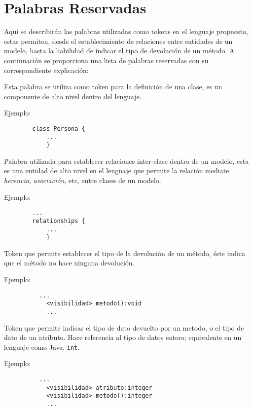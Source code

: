 \section{Palabras Reservadas}
\label{sec:palabrasreservadas}

Aquí se describirán las palabras utilizadas como tokens en el lenguaje
propuesto, estas permiten, desde el establecimiento de relaciones
entre entidades de un modelo, hasta la habilidad de indicar el tipo de devolución
de un método. A continuación se proporciona una lista de palabras reservadas
con su correspondiente explicación:

\begin{description}[align=right,labelwidth=2.5cm]

\item [class] Esta palabra se utiliza como token para la definición de una clase,
	es un componente de alto nivel dentro del lenguaje.

	Ejemplo:
		\begin{lstlisting}
		class Persona {
			...
			}
		\end{lstlisting}

\item [relationships] Palabra utilizada para establecer relaciones inter-clase
	dentro de un modelo, esta es una entidad de alto nivel en el lenguaje que
	permite la relación mediate \textit{herencia}, \textit{asociación}, etc,
	entre clases de un modelo.

	Ejemplo:
		\begin{lstlisting}
		...
		relationships {
			...
			}
		\end{lstlisting}

\item [void] Token que permite establecer el tipo de la devolución de un
	método, éste indica que el método no hace ninguna	devolución.

	Ejemplo:
		\begin{lstlisting}
		  ...
			<visibilidad> metodo():void
			...
		\end{lstlisting}

\item [integer] Token que permite indicar el tipo de dato devuelto por un metodo, o
	el tipo de dato de un atributo. Hace referencia al tipo de
	datos entero; equivalente en un lenguaje como Java, \texttt{int}.

	Ejemplo:
		\begin{lstlisting}
		  ...
			<visibilidad> atributo:integer
			<visibilidad> metodo():integer
			...
		\end{lstlisting}


\end{description}
